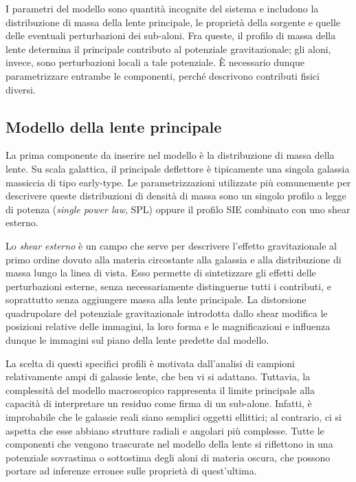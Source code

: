 I parametri del modello sono quantità incognite del sistema e includono la distribuzione di massa della lente principale, le proprietà della sorgente e quelle delle eventuali perturbazioni dei sub-aloni. 
Fra queste, il profilo di massa della lente determina il principale contributo al potenziale gravitazionale; gli aloni, invece, sono perturbazioni locali a tale potenziale. È necessario dunque parametrizzare entrambe le componenti, perché descrivono contributi fisici diversi.  
\subsection{Modello della lente principale}
La prima componente da inserire nel modello è la distribuzione di massa della lente. Su scala galattica, il principale deflettore è tipicamente una singola galassia massiccia di tipo early-type.
Le parametrizzazioni utilizzate più comunemente per descrivere queste distribuzioni di densità di massa sono un singolo profilo a legge di potenza (\emph{single power law}, SPL) oppure il profilo SIE combinato con uno shear esterno. 

Lo \emph{shear esterno} è un campo che serve per descrivere l'effetto gravitazionale al primo ordine dovuto alla materia circostante alla galassia e alla distribuzione di massa lungo la linea di vista. Esso  permette di sintetizzare gli effetti delle perturbazioni esterne, senza necessariamente distinguerne tutti i contributi, e soprattutto senza aggiungere massa alla lente principale. La distorsione quadrupolare del potenziale gravitazionale introdotta dallo shear modifica le posizioni relative delle immagini, la loro forma e le magnificazioni e influenza dunque le immagini sul piano della lente predette dal modello. 

La scelta di questi specifici profili è motivata dall'analisi di campioni relativamente ampi di galassie lente, che ben vi si adattano.
Tuttavia, la complessità del modello macroscopico rappresenta il limite principale alla capacità di interpretare un residuo come firma di un sub-alone. 
Infatti,  è improbabile che le galassie reali siano semplici oggetti ellittici; al contrario, ci si aspetta che esse abbiano strutture radiali  e angolari più complesse.  Tutte le componenti che vengono trascurate nel modello della lente si riflettono in una potenziale sovrastima o sottostima degli aloni di materia oscura, che possono portare ad inferenze erronee sulle proprietà di quest'ultima.

